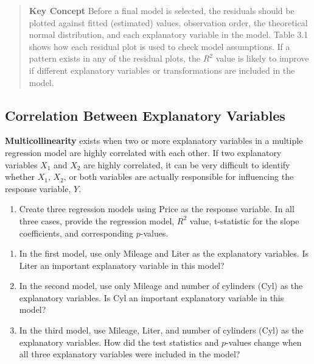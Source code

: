 \documentclass[
]{report}
\providecommand{\tightlist}{%
  \setlength{\itemsep}{0pt}\setlength{\parskip}{0pt}}
\theoremstyle{definition}
\theoremstyle{definition}
\theoremstyle{definition}
\theoremstyle{definition}
\theoremstyle{remark}
\begin{document}
\begin{quote}
\textbf{Key Concept}
Before a final model is selected, the residuals should be plotted against fitted (estimated) values, observation order, the theoretical normal distribution, and each explanatory variable in the model. Table 3.1 shows how each residual plot is used to check model assumptions. If a pattern exists in any of the residual plots, the \(R^2\) value is likely to improve if different explanatory variables or transformations are included in the model.
\end{quote}

\hypertarget{correlation-between-explanatory-variables}{%
\subsection*{Correlation Between Explanatory Variables}\label{correlation-between-explanatory-variables}}

\textbf{Multicollinearity} exists when two or more explanatory variables in a multiple regression model are highly correlated with each other. If two explanatory variables \(X_1\) and \(X_2\) are highly correlated, it can be very difficult to identify whether \(X_1\), \(X_2\), or both variables are actually responsible for influencing the response variable, \(Y\).

\begin{enumerate}
\def\labelenumi{\arabic{enumi}.}
\setcounter{enumi}{13}
\tightlist
\item
  Create three regression models using Price as the response variable. In all three cases, provide the regression model, \(R^2\) value, t-statistic for the slope coefficients, and corresponding \(p\)-values.
\end{enumerate}

\begin{enumerate}
\def\labelenumi{\alph{enumi}.}
\tightlist
\item
  In the first model, use only Mileage and Liter as the explanatory variables. Is Liter an important explanatory variable in this model?
\item
  In the second model, use only Mileage and number of cylinders (Cyl) as the explanatory variables. Is Cyl an important explanatory variable in this model?
\item
  In the third model, use Mileage, Liter, and number of cylinders (Cyl) as the explanatory variables. How did the test statistics and \(p\)-values change when all three explanatory variables were included in the model?
\end{enumerate}
\end{document}
